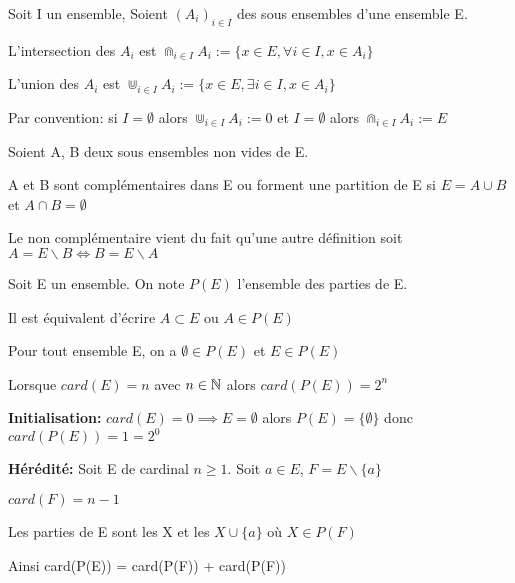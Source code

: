 \documentclass[a4paper, 12pt]{article}
\begin{document}
\begin{definition}
    Soit I un ensemble, Soient $(A_i)_{i \in I}$ des sous ensembles d'une ensemble E.

    L'intersection des $A_i$ est $\Cap_{i \in I} A_i := \{x \in E, \forall i \in I, x \in A_i\}$
    
    L'union des $A_i$ est $\Cup_{i \in I} A_i := \{x \in E, \exists i \in I, x \in A_i\}$

    Par convention: si  $I = \emptyset$ alors $\Cup_{i \in I} A_i := 0$ et $I = \emptyset$ alors $\Cap_{i \in I} A_i := E$
\end{definition}

\begin{definition}
    Soient A, B deux sous ensembles non vides de E.

    A et B sont complémentaires dans E ou forment une partition de E si
    $E = A \cup B$ et $A \cap B = \emptyset$
\end{definition}

\begin{remark}
    Le non complémentaire vient du fait qu'une autre définition soit $A = E\backslash B \iff B = E\backslash A$
\end{remark}

Soit E un ensemble. On note $P(E)$ l'ensemble des parties de E.

\begin{remark}
    Il est équivalent d'écrire $A \subset E$ ou $A \in P(E)$
\end{remark}

\begin{remark}
    Pour tout ensemble E, on a $\emptyset \in P(E)$ et $E \in P(E)$
\end{remark}

\begin{theorem}
    Lorsque $card(E) = n$ avec $n \in \mathbb{N}$ alors $card(P(E)) = 2^n$
\end{theorem}

\begin{demonstration}
\textbf{Initialisation:} $card(E) = 0 \implies E = \emptyset$ alors $P(E) = \{\emptyset\}$ donc $card(P(E)) = 1 = 2^0$ 

\textbf{Hérédité:} Soit E de cardinal $n \geq 1$. Soit $a \in E$, $F = E\backslash \{a\}$

$card(F) = n - 1$

Les parties de E sont les X et les $X \cup \{a\}$ où $X \in P(F)$

Ainsi card(P(E)) = card(P(F)) + card(P(F))
\end{demonstration}
\end{document}
